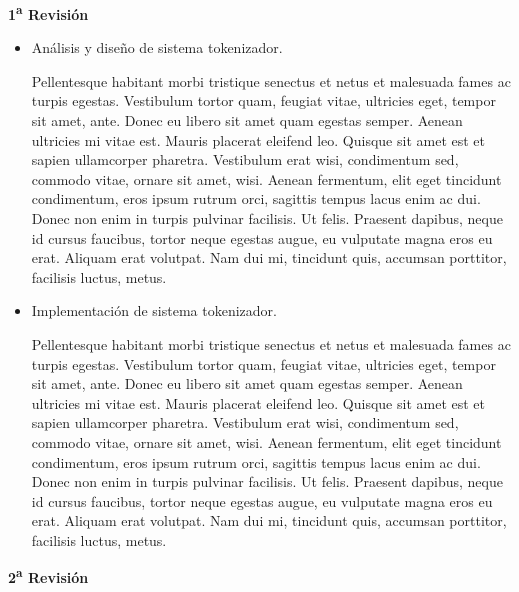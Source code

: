 \documentclass[10pt, letterpaper]{article}
\begin{document}
  \noindent
  \textbf{1\textsuperscript{a} Revisión}

  \begin{itemize}

    \item Análisis y diseño de sistema tokenizador.

      Pellentesque habitant morbi tristique senectus et netus et malesuada fames
      ac turpis egestas. Vestibulum tortor quam, feugiat vitae, ultricies eget,
      tempor sit amet, ante. Donec eu libero sit amet quam egestas semper.
      Aenean ultricies mi vitae est. Mauris placerat eleifend leo. Quisque sit
      amet est et sapien ullamcorper pharetra. Vestibulum erat wisi, condimentum
      sed, commodo vitae, ornare sit amet, wisi. Aenean fermentum, elit eget
      tincidunt condimentum, eros ipsum rutrum orci, sagittis tempus lacus enim
      ac dui. Donec non enim in turpis pulvinar facilisis. Ut felis. Praesent
      dapibus, neque id cursus faucibus, tortor neque egestas augue, eu
      vulputate magna eros eu erat. Aliquam erat volutpat. Nam dui mi, tincidunt
      quis, accumsan porttitor, facilisis luctus, metus.

    \item Implementación de sistema tokenizador.

      Pellentesque habitant morbi tristique senectus et netus et malesuada fames
      ac turpis egestas. Vestibulum tortor quam, feugiat vitae, ultricies eget,
      tempor sit amet, ante. Donec eu libero sit amet quam egestas semper.
      Aenean ultricies mi vitae est. Mauris placerat eleifend leo. Quisque sit
      amet est et sapien ullamcorper pharetra. Vestibulum erat wisi, condimentum
      sed, commodo vitae, ornare sit amet, wisi. Aenean fermentum, elit eget
      tincidunt condimentum, eros ipsum rutrum orci, sagittis tempus lacus enim
      ac dui. Donec non enim in turpis pulvinar facilisis. Ut felis. Praesent
      dapibus, neque id cursus faucibus, tortor neque egestas augue, eu
      vulputate magna eros eu erat. Aliquam erat volutpat. Nam dui mi, tincidunt
      quis, accumsan porttitor, facilisis luctus, metus.

  \end{itemize}

  \noindent
  \textbf{2\textsuperscript{a} Revisión}
\end{document}
